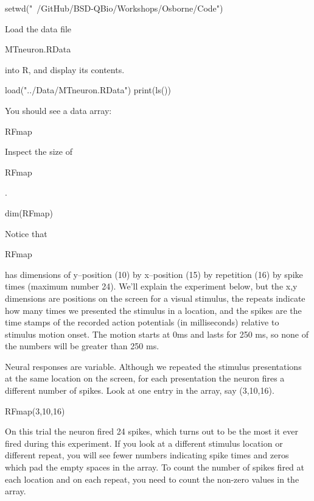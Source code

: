 \documentclass[
letterpaper, %
11pt, %
 oneside, 
onecolumn, %
]{memoir}
\numberwithin{Exercise}{chapter}
\begin{document}
\begin{shortrcode}
setwd("~/GitHub/BSD-QBio/Workshops/Osborne/Code")
\end{shortrcode}   

Load the data file \begin{ttfamily}MTneuron.RData\end{ttfamily}  into R, and display its contents. 


\begin{shortrcode}
load("../Data/MTneuron.RData")
print(ls())
\end{shortrcode}   



You should see a data array:  

\begin{hint}
		RFmap
\end{hint}  

 

Inspect the size of \begin{ttfamily}RFmap\end{ttfamily}. 


\begin{shortrcode}
dim(RFmap)
\end{shortrcode}

Notice that \begin{ttfamily}RFmap\end{ttfamily} has dimensions of y--position (10) by x--position (15) by repetition (16) by spike times (maximum number 24).  We'll explain the experiment below, but the x,y dimensions are positions on the screen for a visual stimulus, the repeats indicate how many times we presented the stimulus in a location, and the spikes are the time stamps of the recorded action potentials (in milliseconds) relative to stimulus motion onset.   The motion starts at 0ms and lasts for 250 ms, so none of the numbers will be greater than 250 ms. 

Neural responses are variable.  Although we repeated the stimulus presentations at the same location on the screen, for each presentation the neuron fires a different number of spikes.    Look at one entry in the array, say (3,10,16).    

\begin{shortrcode}
RFmap(3,10,16)
\end{shortrcode}

On this trial the neuron fired 24 spikes, which turns out to be the most it ever fired during this experiment.    If you look at a different stimulus location or different repeat, you will see fewer numbers indicating spike times and zeros which pad the empty spaces in the array.  To count the number of spikes fired at each location and on each repeat, you need to count the non-zero values in the array.
\end{document}
